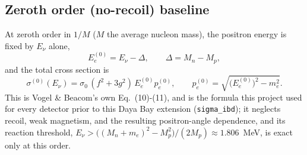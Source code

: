 \begin{theorybox}
\subsection*{Zeroth order (no-recoil) baseline}
At zeroth order in $1/M$ ($M$ the average nucleon mass), the positron
energy is fixed by $E_\nu$ alone,
\begin{equation}
  E_e^{(0)} = E_\nu - \Delta,\qquad \Delta = M_n - M_p,
\end{equation}
and the total cross section is
\begin{equation}
  \sigma^{(0)}(E_\nu) = \sigma_0\,(f^2+3g^2)\,E_e^{(0)} p_e^{(0)},\qquad
  p_e^{(0)} = \sqrt{\bigl(E_e^{(0)}\bigr)^2-m_e^2}.
  \label{eq:ibd-zeroth-order}
\end{equation}
This is Vogel \& Beacom's own Eq.~(10)-(11), and is the formula this
project used for every detector prior to this Daya Bay extension
(\texttt{sigma\_ibd}); it neglects recoil, weak magnetism, and the
resulting positron-angle dependence, and its reaction threshold,
$E_\nu > \bigl((M_n+m_e)^2-M_p^2\bigr)/(2M_p)\approx1.806$~MeV, is exact
only at this order.


\end{theorybox}
